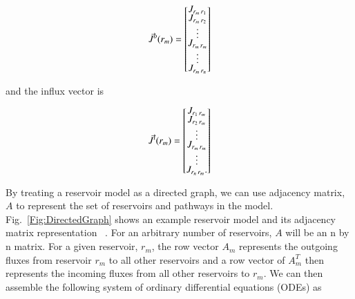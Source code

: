 \begin{equation}
\renewcommand\arraystretch{0.5}
\vec{J}^{o}(r_m) = 
\begin{bmatrix}
    \flux{r_m}{r_1} \\
    \flux{r_m}{r_2} \\
    \vdots \\
    \flux{r_m}{r_m} \\
    \vdots \\
    \flux{r_m}{r_n}
\end{bmatrix}
\end{equation}

and the influx vector is

\begin{equation}
\vec{J}^{i}(r_m) =
\renewcommand\arraystretch{0.5}
\begin{bmatrix}
    \flux{r_1}{r_m} \\
    \flux{r_2}{r_m} \\
    \vdots \\
    \flux{r_m}{r_m} \\
    \vdots \\
    \flux{r_n}{r_m}.
\end{bmatrix}
\end{equation}

By treating a reservoir model as a directed graph, we can use adjacency matrix, $A$ to represent the set of reservoirs and pathways in the model. Fig.~\ref{Fig:DirectedGraph} shows an example reservoir model and its adjacency matrix representation ~\cite{CTH:2009}. For an arbitrary number of reservoirs, $A$ will be an n by n matrix. For a given reservoir, $r_m$, the row vector $A_m$ represents the outgoing fluxes from reservoir $r_m$ to all other reservoirs and a row vector of $A^{T}_{m}$ then represents the incoming fluxes from all other reservoirs to $r_m$. We can then assemble the following system of ordinary differential equations (ODEs) as

